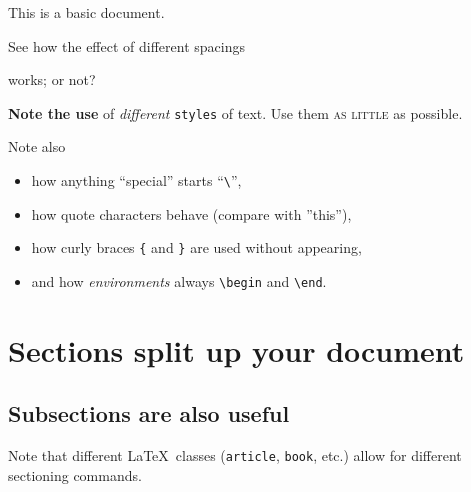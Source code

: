 \documentclass[a4paper]{article}
\begin{document}
This is a basic document.

See
how
the
effect of   different           spacings

works; or not?

\textbf{Note the use} of \textit{different} \texttt{styles} of
text. Use them \textsc{as little} as possible.

Note also
\begin{itemize}
\item how anything ``special'' starts ``\verb|\|'',
\item how quote characters behave (compare with ''this''),
\item how curly braces \verb|{| and \verb|}| are used without
  appearing,
\item and how \emph{environments} always \verb|\begin| and
    \verb|\end|.
\end{itemize}


\section{Sections split up your document}
\label{sec:TopSection}


\subsection{Subsections are also useful}
\label{sec:SubSection}

Note that different \LaTeX\ classes (\texttt{article}, \texttt{book},
etc.) allow for different sectioning commands.
\end{document}
